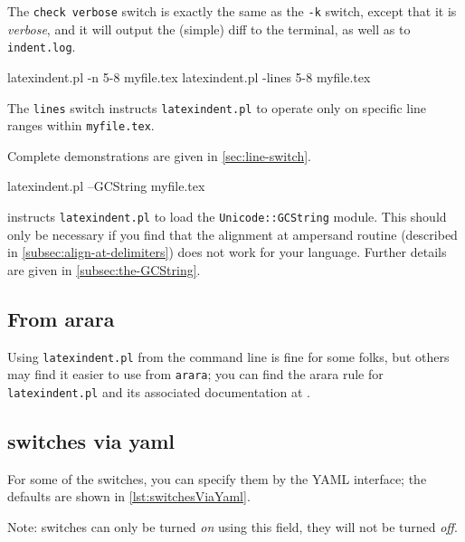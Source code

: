   The \texttt{check verbose}
 switch is exactly the same as the \texttt{-k} switch, except that it is \emph{verbose},
 and it will output the (simple) diff to the terminal, as well as to \texttt{indent.log}.


 \begin{commandshell}
latexindent.pl -n 5-8 myfile.tex
latexindent.pl -lines 5-8 myfile.tex
\end{commandshell}

  The \texttt{lines} switch instructs
 \texttt{latexindent.pl} to operate only on specific line ranges within
 \texttt{myfile.tex}.

 Complete demonstrations are given in \cref{sec:line-switch}.


 \begin{commandshell}
latexindent.pl --GCString myfile.tex
\end{commandshell}

  instructs \texttt{latexindent.pl} to load the
 \texttt{Unicode::GCString} module. This should only be necessary if you find that the
 alignment at ampersand routine (described in \cref{subsec:align-at-delimiters}) does not
 work for your language. Further details are given in \cref{subsec:the-GCString}.

\subsection{From arara}\label{sec:arara}
 Using \texttt{latexindent.pl} from the command line is fine for some folks, but others
 may find it easier to use from \texttt{arara}; you can find the arara rule for
 \texttt{latexindent.pl} and its associated documentation at \cite{paulo}.

\subsection{switches via yaml}

 For some of the switches, you can specify
 them by the YAML interface; the defaults are shown in \cref{lst:switchesViaYaml}.

 Note: switches can only be turned \emph{on} using this field, they will not be turned
 \emph{off}.

